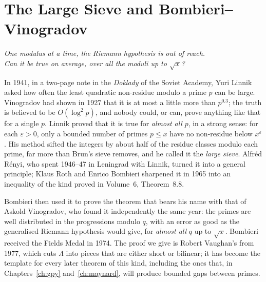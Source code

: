 \chapter{The Large Sieve and Bombieri--Vinogradov}\label{ch:largesieve}
\begin{center}\itshape
One modulus at a time, the Riemann hypothesis is out of reach.\\
Can it be true on average, over all the moduli up to $\sqrt x$?
\end{center}

In 1941, in a two-page note in the \emph{Doklady} of the Soviet Academy, Yuri Linnik asked how often the least quadratic non-residue modulo a prime $p$ can be large. Vinogradov had shown in 1927 that it is at most a little more than $p^{0.3}$; the truth is believed to be $O(\log^2p)$, and nobody could, or can, prove anything like that for a single $p$. Linnik proved that it is true for \emph{almost all} $p$, in a strong sense: for each $\varepsilon>0$, only a bounded number of primes $p\le x$ have no non-residue below $x^\varepsilon$. His method sifted the integers by about half of the residue classes modulo each prime, far more than Brun's sieve removes, and he called it the \emph{large sieve}. Alfréd Rényi, who spent 1946--47 in Leningrad with Linnik, turned it into a general principle; Klaus Roth and Enrico Bombieri sharpened it in 1965 into an inequality of the kind proved in Volume~6, Theorem~8.8.

Bombieri then used it to prove the theorem that bears his name with that of Askold Vinogradov, who found it independently the same year: the primes are well distributed in the progressions modulo $q$, with an error as good as the generalised Riemann hypothesis would give, for \emph{almost all} $q$ up to $\sqrt x$. Bombieri received the Fields Medal in 1974. The proof we give is Robert Vaughan's from 1977, which cuts $\Lambda$ into pieces that are either short or bilinear; it has become the template for every later theorem of this kind, including the ones that, in Chapters~\ref{ch:gpy} and~\ref{ch:maynard}, will produce bounded gaps between primes.

